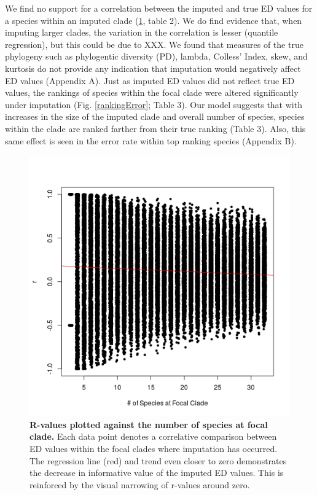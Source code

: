 \documentclass[12pt,english]{article}
\begin{document}
We find no support for a correlation between the imputed and true ED values for
a species within an imputed clade (\ref{imputationTrend}, table 2). We
do find evidence that, when imputing larger clades, the variation in the
correlation is lesser (quantile regression), but this could be due to XXX. We
found that measures of the true phylogeny such as phylogentic diversity (PD),
lambda, Colless' Index, skew, and kurtosis do not provide any indication that
imputation would negatively affect ED values (Appendix A). Just as imputed ED
values did not reflect true ED values, the rankings of species within the focal
clade were altered significantly under imputation (Fig. \ref{rankingError};
Table 3). Our model suggests that with increases in the size of the imputed
clade and overall number of species, species within the clade are ranked farther
from their true ranking (Table 3). Also, this same effect is seen in the error
rate within top ranking species (Appendix B).

\begin{figure}[!ht]
  \center
  \includegraphics[width=.5\textwidth]{edModel.png}
  \caption{\textbf{R-values plotted against the number of species at focal
  clade.} Each data point denotes a correlative comparison between ED values
  within the focal clades where imputation has occurred. The regression line
  (red) and trend even closer to zero demonstrates the decrease in informative
  value of the imputed ED values. This is reinforced by the visual narrowing of
  r-values around zero.}
  \label{imputationTrend}
\end{figure}
\end{document}
